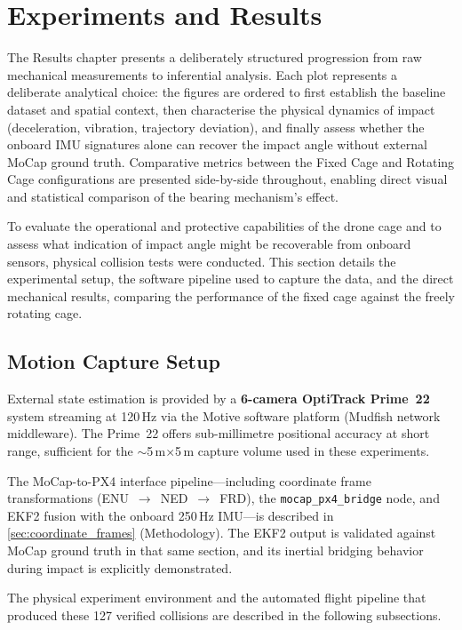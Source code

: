 \clearpage
\section{Experiments and Results}

The Results chapter presents a deliberately structured progression from raw mechanical measurements to inferential analysis. Each plot represents a deliberate analytical choice: the figures are ordered to first establish the baseline dataset and spatial context, then characterise the physical dynamics of impact (deceleration, vibration, trajectory deviation), and finally assess whether the onboard IMU signatures alone can recover the impact angle without external MoCap ground truth. Comparative metrics between the Fixed Cage and Rotating Cage configurations are presented side-by-side throughout, enabling direct visual and statistical comparison of the bearing mechanism's effect.

To evaluate the operational and protective capabilities of the drone cage and to assess what indication of impact angle might be recoverable from onboard sensors, physical collision tests were conducted. This section details the experimental setup, the software pipeline used to capture the data, and the direct mechanical results, comparing the performance of the fixed cage against the freely rotating cage.

\subsection{Motion Capture Setup}
\label{sec:motion_capture}

External state estimation is provided by a \textbf{6-camera OptiTrack Prime~22} system streaming at 120\,Hz via the Motive software platform (Mudfish network middleware). The Prime~22 offers sub-millimetre positional accuracy at short range, sufficient for the $\sim$5\,m$\times$5\,m capture volume used in these experiments.

The MoCap-to-PX4 interface pipeline---including coordinate frame transformations (ENU~$\to$~NED~$\to$~FRD), the \texttt{mocap\_px4\_bridge} node, and EKF2 fusion with the onboard 250\,Hz IMU---is described in \autoref{sec:coordinate_frames} (Methodology). The EKF2 output is validated against MoCap ground truth in that same section, and its inertial bridging behavior during impact is explicitly demonstrated.

The physical experiment environment and the automated flight pipeline that produced these 127 verified collisions are described in the following subsections.

